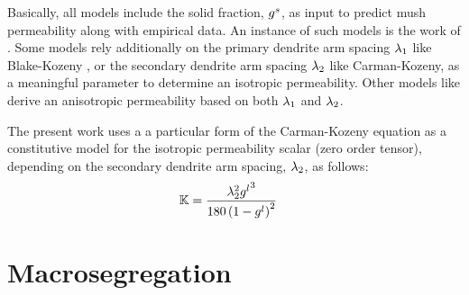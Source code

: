 Basically, all models include the solid fraction, ${g^s}$, as input to predict mush permeability along with empirical data. 
An instance of such models is the work of \citet{xu_gravity-_1991}.
Some models rely additionally on the primary dendrite arm spacing ${\lambda}_{1}$ like Blake-Kozeny \citep{ramirez_evaluation_2003}, or the secondary 
dendrite arm spacing ${\lambda}_{2}$ like Carman-Kozeny, as a meaningful parameter to determine an isotropic permeability. 
Other models like \citet{poirier_permeability_1987,felicelli_simulation_1991} derive an anisotropic permeability based on both ${\lambda}_{1}$ and ${\lambda}_{2}$.

The present work uses a a particular form of the Carman-Kozeny equation as a constitutive model for the isotropic permeability scalar (zero order tensor),
depending on the secondary dendrite arm spacing, ${\lambda}_{2}$, as follows:
\begin{align}
\label{eq:permeability}
& \mathbb{K}  = \frac{{\lambda}_{2}^2 {g^l}^3}{180\left( 1-{g^l} \right)^2}
\end{align}


\section{Macrosegregation}

